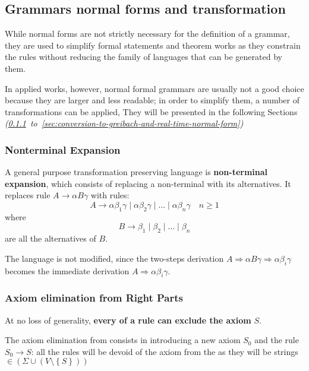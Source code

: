 \documentclass[english]{article}
\begin{document}
\subsection{Grammars normal forms and transformation}

While normal forms are not strictly necessary for the definition of a grammar, they are used to simplify formal statements and theorem works as they constrain the rules without reducing the family of languages that can be generated by them.

In applied works, however, normal formal grammars are usually not a good choice because they are larger and less readable;
in order to simplify them, a number of transformations can be applied,
They will be presented in the following Sections \textit{(\ref{sec:non-terminal-expansion}~to~\ref{sec:conversion-to-greibach-and-real-time-normal-form})}

\subsubsection{Nonterminal Expansion}
\label{sec:non-terminal-expansion}

A general purpose transformation preserving language is \textbf{non-terminal expansion}, which consists of replacing a non-terminal with its alternatives.
It replaces rule \(A \rightarrow \alpha B \gamma\) with rules:
\[ A \rightarrow \alpha \beta_1 \gamma \mid \alpha \beta_2 \gamma \mid \ldots \mid \alpha \beta_n \gamma \quad n \geq 1 \]
where
\[ B \rightarrow \beta_1 \mid \beta_2 \mid \ldots \mid \beta_n \] are all the alternatives of \(B\).

The language is not modified, since the two-steps derivation \(A \Rightarrow \alpha B \gamma \Rightarrow \alpha \beta_i \gamma\) becomes the immediate derivation \(A \Rightarrow \alpha \beta_i \gamma\).

\subsubsection{Axiom elimination from Right Parts}
\label{sec:axiom-elimination-from-right-parts}

At no loss of generality, \textbf{every \RP of a rule can exclude the axiom} \(S\).

The axiom elimination from \RP consists in introducing a new axiom \(S_0\) and the rule \(S_0 \rightarrow S\):
all the rules will be devoid of the axiom from the \RP as they will be strings \(\in \left( \Sigma \cup \left( V \setminus \left\{ S \right\} \right) \right)\)
\end{document}
